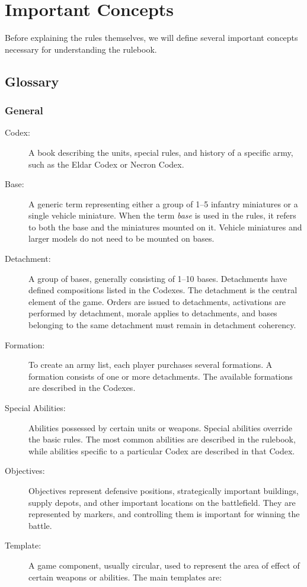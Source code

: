 \section{Important Concepts}

Before explaining the rules themselves, we will define several important concepts necessary for understanding the rulebook.

\subsection{Glossary}

\subsubsection{General}

\begin{description}
    \item[Codex:] A book describing the units, special rules, and history of a specific army, such as the Eldar Codex or Necron Codex.

    \item[Base:] A generic term representing either a group of 1--5 infantry miniatures or a single vehicle miniature. When the term \textit{base} is used in the rules, it refers to both the base and the miniatures mounted on it. Vehicle miniatures and larger models do not need to be mounted on bases.

    \item[Detachment:] A group of bases, generally consisting of 1--10 bases. Detachments have defined compositions listed in the Codexes. The detachment is the central element of the game. Orders are issued to detachments, activations are performed by detachment, morale applies to detachments, and bases belonging to the same detachment must remain in detachment coherency.

    \item[Formation:] To create an army list, each player purchases several formations. A formation consists of one or more detachments. The available formations are described in the Codexes.

    \item[Special Abilities:] Abilities possessed by certain units or weapons. Special abilities override the basic rules. The most common abilities are described in the rulebook, while abilities specific to a particular Codex are described in that Codex.

    \item[Objectives:] Objectives represent defensive positions, strategically important buildings, supply depots, and other important locations on the battlefield. They are represented by markers, and controlling them is important for winning the battle.

    \item[Template:] A game component, usually circular, used to represent the area of effect of certain weapons or abilities. The main templates are:
\end{description}

